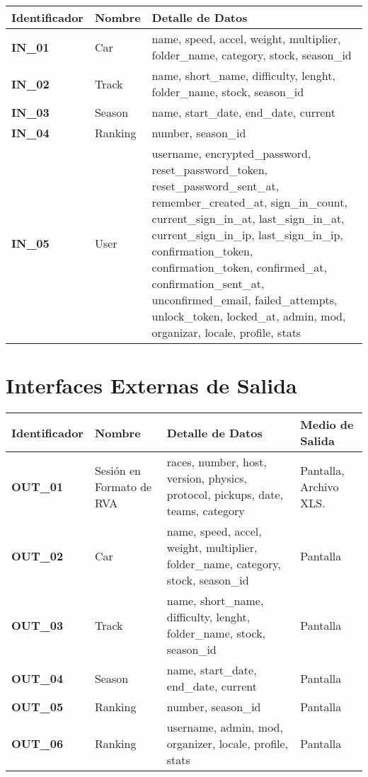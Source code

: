 \begin{center}
	\begin{tabular}{ | l | p{5.5cm} | p{8cm} |}
		\hline
		{\textbf{Identificador}} & 	{\textbf{Nombre}} & {\textbf{Detalle de Datos}} \\ \hline
		{\textbf{IN\_01}} & Car & name, speed, accel, weight, multiplier, folder\_name, category, stock, season\_id \\ \hline
		{\textbf{IN\_02}} & Track &  name, short\_name, difficulty, lenght, folder\_name, stock, season\_id \\ \hline
		{\textbf{IN\_03}} & Season & name, start\_date, end\_date, current \\ \hline
		{\textbf{IN\_04}} & Ranking & number, season\_id \\ \hline
		{\textbf{IN\_05}} & User & username, encrypted\_password, reset\_password\_token, reset\_password\_sent\_at, remember\_created\_at, sign\_in\_count, current\_sign\_in\_at, last\_sign\_in\_at, current\_sign\_in\_ip, last\_sign\_in\_ip, confirmation\_token, confirmation\_token, confirmed\_at, confirmation\_sent\_at, unconfirmed\_email, failed\_attempts, unlock\_token, locked\_at, admin, mod, organizar, locale, profile, stats \\ \hline
	\end{tabular}
\end{center}

\newpage

\section{Interfaces Externas de Salida}

\begin{center}
	\begin{tabular}{ | l | p{3.5cm} | p{6cm} | p{4cm} |}
		\hline
		{\textbf{Identificador}} & 	{\textbf{Nombre}} & {\textbf{Detalle de Datos}} & {\textbf{Medio de Salida}} \\
		\hline
		{\textbf{OUT\_01}} & Sesión en Formato de RVA & races, number, host, version, physics, protocol, pickups, date, teams, category & Pantalla, Archivo XLS. \\ \hline
		{\textbf{OUT\_02}} & Car & name, speed, accel, weight, multiplier, folder\_name, category, stock, season\_id & Pantalla \\ \hline
		{\textbf{OUT\_03}} & Track & name, short\_name, difficulty, lenght, folder\_name, stock, season\_id & Pantalla \\ \hline
		{\textbf{OUT\_04}} & Season & name, start\_date, end\_date, current & Pantalla \\ \hline
		{\textbf{OUT\_05}} & Ranking & number, season\_id & Pantalla \\ \hline
		{\textbf{OUT\_06}} & Ranking & username, admin, mod, organizer, locale, profile, stats & Pantalla \\ \hline
	\end{tabular}
\end{center}

